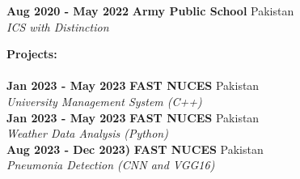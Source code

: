 \documentclass[a4paper,10pt]{article}
\begin{document}
\vspace{5pt}

\textbf{Aug 2020 - May 2022} \hfill \textbf{Army Public School} \hfill Pakistan\\
\textit{ICS with Distinction}

\vspace{5pt}

\textbf{Projects:} \\\\
\textbf{Jan 2023 - May 2023} \hfill \textbf{FAST NUCES} \hfill Pakistan\\
\textit{University Management System (C++)}\\
\textbf{Jan 2023 - May 2023} \hfill \textbf{FAST NUCES} \hfill Pakistan\\
\textit{Weather Data Analysis (Python)}\\
\textbf{Aug 2023 - Dec 2023)} \hfill \textbf{FAST NUCES} \hfill Pakistan\\
\textit{Pneumonia Detection (CNN and VGG16)}



\end{document}
